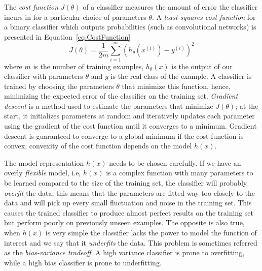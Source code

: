 The \emph{cost function} $J(\theta)$ of a classifier measures the amount of error the classifier incurs in for a particular choice of parameters $\theta$. A \emph{least-squares cost function} for a binary classifier which outputs probabilities (such as convolutional networks) is presented in Equation~\ref{eq:CostFunction} 
\begin{equation}
	J(\theta) = \frac{1}{2m}\sum_{i=1}^m(h_\theta(x^{(i)}) - y^{(i)})^2
	\label{eq:CostFunction}
\end{equation}
where $m$ is the number of training examples, $h_\theta(x)$ is the output of our classifier with parameters $\theta$ and $y$ is the real class of the example. A classifier is trained by choosing the parameters $\theta$ that minimize this function, hence, minimizing the expected error of the classifier on the training set. \emph{Gradient descent} is a method used to estimate the parameters that minimize $J(\theta)$; at the start, it initializes parameters at random and iteratively updates each parameter using the gradient of the cost function until it converges to a minimum. Gradient descent is guaranteed to converge to a global minimum if the cost function is convex, convexity of the cost function depends on the model $h(x)$.

The model representation $h(x)$ needs to be chosen carefully. If we have an overly \emph{flexible} model, i.e, $h(x)$ is a complex function with many parameters to be learned compared to the size of the training set, the classifier will probably \emph{overfit} the data, this means that the parameters are fitted way too closely to the data and will pick up every small fluctuation and noise in the training set. This causes the trained classifier to produce almost perfect results on the training set but perform poorly on previously unseen examples. The opposite is also true, when $h(x)$ is very simple the classifier lacks the power to model the function of interest and we say that it \emph{underfits} the data. This problem is sometimes referred as the \emph{bias-variance tradeoff}. A high variance classifier is prone to overfitting, while a high bias classifier is prone to underfitting.

